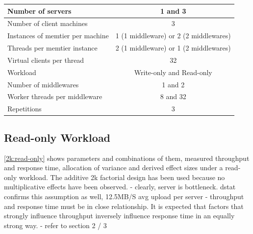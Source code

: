 \documentclass[11pt,a4paper]{article}
\begin{document}
\begin{center}
	\scriptsize{
		\begin{tabular}{|l|c|}
			\hline Number of servers                & 1 and 3                                     \\ 
			\hline Number of client machines        & 3                                           \\ 
			\hline Instances of memtier per machine & 1 (1 middleware) or 2 (2 middlewares)       \\ 
			\hline Threads per memtier instance     & 2 (1 middleware) or 1 (2 middlewares)       \\
			\hline Virtual clients per thread       & 32                                          \\ 
			\hline Workload                         & Write-only and Read-only                    \\
			\hline Number of middlewares            & 1 and 2                                     \\
			\hline Worker threads per middleware    & 8 and 32                                    \\
			\hline Repetitions                      & 3                                   \\ 
			\hline 
		\end{tabular}
	} 
\end{center}

\subsection{Read-only Workload}

\autoref{2k:read-only} shows parameters and combinations of them, measured throughput and response time, allocation of variance and derived effect sizes under a read-only workload. The additive 2k factorial design has been used because no multiplicative effects have been observed.
- clearly, server is bottleneck. dstat confirms this assumption as well, 12.5MB/S avg upload per server
- throughput and response time must be in close relationship. It is expected that factors that strongly influence throughput inversely influence response time in an equally strong way.
- refer to section 2 / 3
\end{document}
